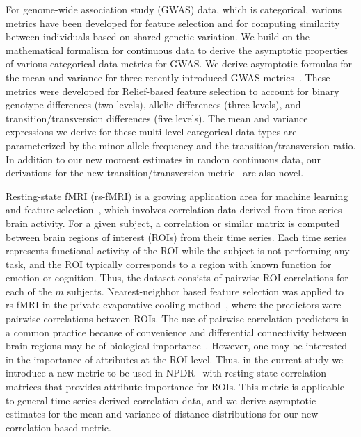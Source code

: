\documentclass[10pt,letterpaper]{article}
\begin{document}
For genome-wide association study (GWAS) data, which is categorical, various metrics have been developed for feature selection and for computing similarity between individuals based on shared genetic variation. We build on the mathematical formalism for continuous data to derive the asymptotic properties of various categorical data metrics for GWAS. We derive asymptotic formulas for the mean and variance for three recently introduced GWAS metrics~\cite{arabnejad2018}. These metrics were developed for Relief-based feature selection to account for binary genotype differences (two levels), allelic differences (three levels), and transition/transversion differences (five levels). The mean and variance expressions we derive for these multi-level categorical data types are parameterized by the minor allele frequency and the transition/transversion ratio. In addition to our new moment estimates in random continuous data, our derivations for the new transition/transversion metric~\cite{arabnejad2018} are also novel.

Resting-state fMRI (rs-fMRI) is a growing application area for machine learning and feature selection~\cite{venkataraman2010,hay2017,sundermann2014,vergun2013}, which involves correlation data derived from time-series brain activity. For a given subject, a correlation or similar matrix is computed between brain regions of interest (ROIs) from their time series. Each time series represents functional activity of the ROI while the subject is not performing any task, and the ROI typically corresponds to a region with known function for emotion or cognition. Thus, the dataset consists of pairwise ROI correlations for each of the $m$ subjects. Nearest-neighbor based feature selection was applied to rs-fMRI in the private evaporative cooling method~\cite{le17}, where the predictors were pairwise correlations between ROIs. The use of pairwise correlation predictors is a common practice because of convenience and differential connectivity between brain regions may be of biological importance~\cite{gotts2012}. However, one may be interested in the importance of attributes at the ROI level. Thus, in the current study we introduce a new metric to be used in NPDR~\cite{npdr2} with resting state correlation matrices that provides attribute importance for ROIs. This metric is applicable to general time series derived correlation data, and we derive asymptotic estimates for the mean and variance of distance distributions for our new correlation based metric.
\end{document}
